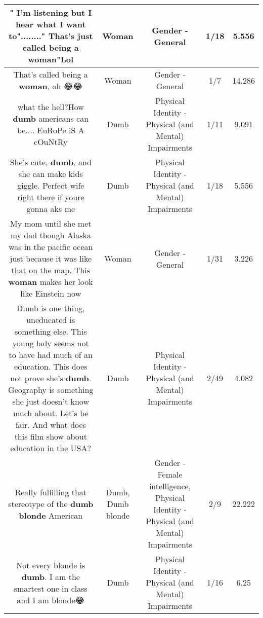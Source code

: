 \documentclass[11pt]{article}
\newlength\mylength
\begin{document}
\begin{center}
\begin{longtable}{|C{.65\mylength}|C{.30\mylength}|C{.12\mylength}|C{.12\mylength}|C{.12\mylength}|}
  \small " I'm listening but I hear what I want to"........" That's just called being a \textbf{woman}"Lol\normalsize   & Woman & Gender - General & 1/18 & 5.556 \\  \hline
  \small That's called being a \textbf{woman},  oh  😂😂\normalsize   & Woman & Gender - General & 1/7 & 14.286 \\  \hline
  \small what the hell?How \textbf{dumb} americans can be.... EuRoPe iS A cOuNtRy\normalsize   & Dumb & Physical Identity - Physical (and Mental) Impairments & 1/11 & 9.091 \\  \hline
  \small She's cute, \textbf{dumb}, and she can make kids giggle. Perfect wife right there if youre gonna aks me\normalsize   & Dumb & Physical Identity - Physical (and Mental) Impairments & 1/18 & 5.556 \\  \hline
  \small My mom until she met my dad though Alaska was in the pacific ocean just because it was like that on the map. This \textbf{woman} makes her look like Einstein now\normalsize   & Woman & Gender - General & 1/31 & 3.226 \\  \hline
  \small Dumb is one thing, uneducated is something else. This young lady seems not to have had much of an education. This does not prove she's \textbf{dumb}. Geography is something she just doesn't know much about. Let's be fair. And what does this film show about education in the USA?\normalsize   & Dumb & Physical Identity - Physical (and Mental) Impairments & 2/49 & 4.082 \\  \hline
  \small Really fulfilling that stereotype of the \textbf{d\textbf{umb} blonde} American\normalsize   & Dumb, Dumb blonde & Gender - Female intelligence, Physical Identity - Physical (and Mental) Impairments & 2/9 & 22.222 \\  \hline
  \small Not every blonde is \textbf{dumb}. I am the smartest one in class and I am blonde😂\normalsize   & Dumb & Physical Identity - Physical (and Mental) Impairments & 1/16 & 6.25 \\  \hline

\end{longtable}
\end{center}
\end{document}
